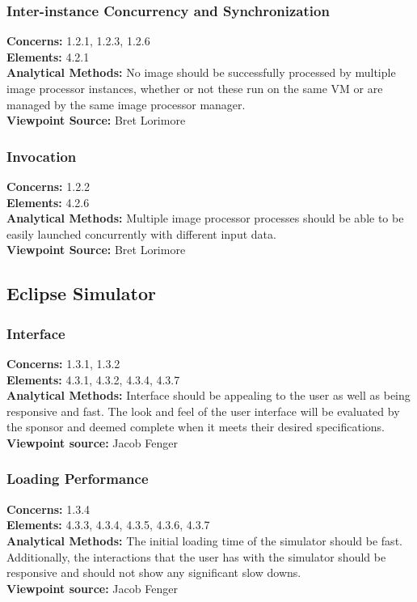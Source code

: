 \documentclass[10pt, onecolumn, draftclsnofoot, letterpaper, compsoc]{IEEEtran}
\begin{document}
    \subsubsection{Inter-instance Concurrency and Synchronization}
    \textbf{Concerns:} 1.2.1, 1.2.3, 1.2.6 \\
    \textbf{Elements:} 4.2.1 \\
    \textbf{Analytical Methods:} No image should be successfully processed by multiple image processor
    instances, whether or not these run on the same VM or are managed by the same image processor manager. \\
    \textbf{Viewpoint Source:} Bret Lorimore \\

    \subsubsection{Invocation}
    \textbf{Concerns:} 1.2.2 \\
    \textbf{Elements:} 4.2.6 \\
    \textbf{Analytical Methods:} Multiple image processor processes should be able to be easily launched
    concurrently with different input data. \\
    \textbf{Viewpoint Source:} Bret Lorimore \\

\subsection{Eclipse Simulator}
  \subsubsection{Interface}
  \textbf{Concerns:} 1.3.1, 1.3.2 \\
  \textbf{Elements:} 4.3.1, 4.3.2, 4.3.4, 4.3.7 \\
  \textbf{Analytical Methods:} Interface should be appealing
  to the user as well as being responsive and fast. The look and feel of the user
  interface will be evaluated by the sponsor and deemed complete when it meets their
  desired specifications. \\
  \textbf{Viewpoint source:} Jacob Fenger \\

  \subsubsection{Loading Performance}
  \textbf{Concerns:} 1.3.4\\
  \textbf{Elements:} 4.3.3, 4.3.4, 4.3.5, 4.3.6, 4.3.7 \\
  \textbf{Analytical Methods:} The initial loading time
  of the simulator should be fast. Additionally, the
  interactions that the user has with the simulator should
  be responsive and should not show any significant slow
  downs. \\
  \textbf{Viewpoint source:} Jacob Fenger \\
\end{document}
